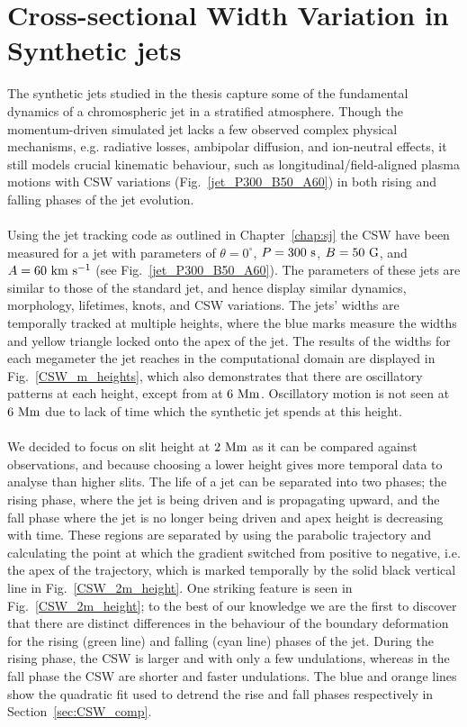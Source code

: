 \documentclass[12pt]{ociamthesis}
\newcommand{\kms}{~\rm{km ~s^{-1}}}
\newcommand{\np}{\\ \\}
\newcommand{\degs}{^{\circ}}
\begin{document}
\section{Cross-sectional Width Variation in Synthetic jets}
\label{sec:CSW_syn_jet}
The synthetic jets studied in the thesis capture some of the fundamental dynamics of a chromospheric jet in a stratified atmosphere. Though the momentum-driven simulated jet lacks a few observed complex physical mechanisms, e.g. radiative losses, ambipolar diffusion, and ion-neutral effects, it still models crucial kinematic behaviour, such as longitudinal/field-aligned plasma motions with CSW variations (Fig.~\ref{jet_P300_B50_A60}) in both rising and falling phases of the jet evolution. \np
%
Using the jet tracking code as outlined in Chapter~\ref{chap:sj} the CSW have been measured for a jet with parameters of $\theta =0\degs$, $P=300~\rm{s}$, $B=50~\rm{G}$, and $A=60\kms$ (see Fig.~\ref{jet_P300_B50_A60}). The parameters of these jets are similar to those of the standard jet, and hence display similar dynamics, morphology, lifetimes, knots, and CSW variations. The jets' widths are temporally tracked at multiple heights, where the blue marks measure the widths and yellow triangle locked onto the apex of the jet. The results of the widths for each megameter the jet reaches in the computational domain are displayed in Fig.~\ref{CSW_m_heights}, which also demonstrates that there are oscillatory patterns at each height, except from at $6~\rm{Mm}$. Oscillatory motion is not seen at $6~\rm{Mm}$ due to lack of time which the synthetic jet spends at this height. \np
%
We decided to focus on slit height at $2~\rm{Mm}$ as it can be compared against observations, and because choosing a lower height gives more temporal data to analyse than higher slits. The life of a jet can be separated into two phases; the rising phase, where the jet is being driven and is propagating upward, and the fall phase where the jet is no longer being driven and apex height is decreasing with time. These regions are separated by using the parabolic trajectory and calculating the point at which the gradient switched from positive to negative, i.e. the apex of the trajectory, which is marked temporally by the solid black vertical line in Fig.~\ref{CSW_2m_height}. One striking feature is seen in Fig.~\ref{CSW_2m_height}; to the best of our knowledge we are the first to discover that there are distinct differences in the behaviour of the boundary deformation for the rising (green line) and falling (cyan line) phases of the jet. During the rising phase, the CSW is larger and with only a few undulations,  whereas in the fall phase the CSW are shorter and faster undulations. The blue and orange lines show the quadratic fit used to detrend the rise and fall phases respectively in Section~\ref{sec:CSW_comp}.
\end{document}
